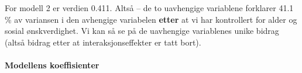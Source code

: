 \documentclass[
]{article}
\newenvironment{Shaded}{\begin{snugshade}}{\end{snugshade}}
\newcommand{\CommentTok}[1]{\textcolor[rgb]{0.56,0.35,0.01}{\textit{#1}}}
\newcommand{\FunctionTok}[1]{\textcolor[rgb]{0.00,0.00,0.00}{#1}}
\newcommand{\NormalTok}[1]{#1}
\newcommand{\OtherTok}[1]{\textcolor[rgb]{0.56,0.35,0.01}{#1}}
\newcommand{\SpecialCharTok}[1]{\textcolor[rgb]{0.00,0.00,0.00}{#1}}
\begin{document}
\begin{Shaded}
\end{Shaded}

For modell 2 er verdien 0.411. Altså -- de to uavhengige variablene forklarer 41.1 \% av variansen i den avhengige variabelen \textbf{etter} at vi har kontrollert for alder og sosial ønskverdighet. Vi kan så se på de uavhengige variablenes unike bidrag (altså bidrag etter at interaksjonseffekter er tatt bort).

\hypertarget{modellens-koeffisienter-1}{%
\paragraph{Modellens koeffisienter}\label{modellens-koeffisienter-1}}
\end{document}
